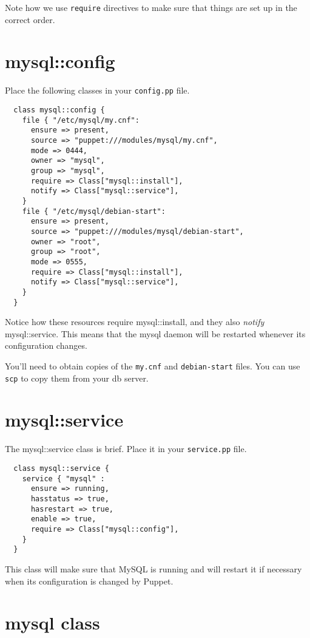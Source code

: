 \documentclass{article}   	%
\begin{document}
Note how we use \texttt{require} directives to make sure that things are set up in the correct order.

\newpage

\section{mysql::config}
Place the following classes in your \texttt{config.pp} file.

\begin{verbatim}
  class mysql::config {
    file { "/etc/mysql/my.cnf":
      ensure => present,
      source => "puppet:///modules/mysql/my.cnf",
      mode => 0444,
      owner => "mysql",
      group => "mysql",
      require => Class["mysql::install"],
      notify => Class["mysql::service"],
    }
    file { "/etc/mysql/debian-start":
      ensure => present,
      source => "puppet:///modules/mysql/debian-start",
      owner => "root",
      group => "root",
      mode => 0555,
      require => Class["mysql::install"],
      notify => Class["mysql::service"],
    }
  }
\end{verbatim}

Notice how these resources require mysql::install, and they also \emph{notify} mysql::service.  This means that the mysql daemon will be restarted whenever its configuration changes.

You'll need to obtain copies of the \texttt{my.cnf} and \texttt{debian-start} files.  You can use \texttt{scp} to copy them from your db server.

\section{mysql::service}
The mysql::service class is brief.  Place it in your \texttt{service.pp} file.

\begin{verbatim}
  class mysql::service {
    service { "mysql" :
      ensure => running,
      hasstatus => true,
      hasrestart => true,
      enable => true,
      require => Class["mysql::config"],
    }
  }
\end{verbatim}

This class will make sure that MySQL is running and will restart it if necessary when its configuration is changed by Puppet.

\section{mysql class}
\end{document}
